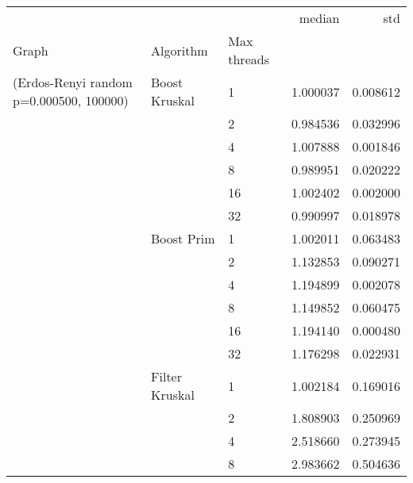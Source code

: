 \begin{tabular}{lllrr}
\toprule
                                                       &                     &    &    median &       std \\
Graph & Algorithm & Max threads &           &           \\
\midrule
(Erdos-Renyi random p=0.000500, 100000) & Boost Kruskal & 1  &  1.000037 &  0.008612 \\
                                                       &                     & 2  &  0.984536 &  0.032996 \\
                                                       &                     & 4  &  1.007888 &  0.001846 \\
                                                       &                     & 8  &  0.989951 &  0.020222 \\
                                                       &                     & 16 &  1.002402 &  0.002000 \\
                                                       &                     & 32 &  0.990997 &  0.018978 \\
                                                       & Boost Prim & 1  &  1.002011 &  0.063483 \\
                                                       &                     & 2  &  1.132853 &  0.090271 \\
                                                       &                     & 4  &  1.194899 &  0.002078 \\
                                                       &                     & 8  &  1.149852 &  0.060475 \\
                                                       &                     & 16 &  1.194140 &  0.000480 \\
                                                       &                     & 32 &  1.176298 &  0.022931 \\
                                                       & Filter Kruskal & 1  &  1.002184 &  0.169016 \\
                                                       &                     & 2  &  1.808903 &  0.250969 \\
                                                       &                     & 4  &  2.518660 &  0.273945 \\
                                                       &                     & 8  &  2.983662 &  0.504636 \\

\end{tabular}

